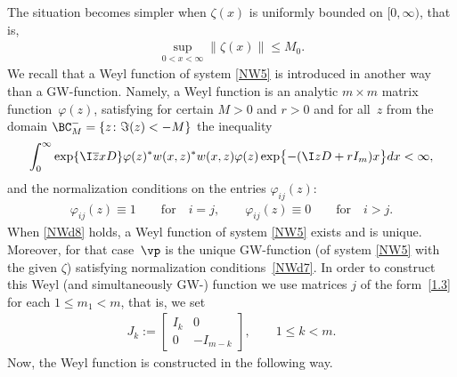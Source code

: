 The situation becomes simpler when
$\zeta(x)$ is uniformly bounded on $[0, \infty)$, that is,
\begin{gather}
  \sup\limits_{0 < x < \infty}
   \bigl\| \zeta (x) \bigr\|
 \leq M_0 .
 \label{NWd8}
\end{gather}
We recall that  a Weyl function of system \eqref{NW5} is introduced in another way
than a GW-function. Namely, a Weyl function
 is an analytic $m \times m$ matrix function~$\varphi (z)$,
satisfying for certain
$M > 0$
and
$r > 0$
and for all~$z$
from the domain
$\BC^{-}_M = \{ z \colon \Im(z) < - M \}$
the inequality
\begin{gather}
  \int_0^\infty
      \exp \{\I \overline z x D \}
     \varphi (z)^*
     w (x,z)^*
     w (x,z)
     \varphi (z)
     \exp
      \bigl\{{-}
        (\I z D + r I_m )x
      \bigr\}
  dx
 < \infty,
 \label{NWd6}
\end{gather}
and the normalization conditions on the entries $\varphi_{ij} (z)$:
\begin{gather}
   \varphi_{ij} (z) \equiv 1 \qquad \mbox{for} \quad i= j, \qquad
   \varphi_{ij} (z) \equiv 0 \qquad \mbox{for} \quad i > j.
 \label{NWd7}
\end{gather}
When \eqref{NWd8} holds,
a Weyl function of system \eqref{NW5} exists and is unique.
Moreover, for that case~$\vp$ is the unique GW-function (of system \eqref{NW5} with the given $\zeta$)
satisfying normalization conditions~\eqref{NWd7}. In order to construct this Weyl (and simultaneously GW-) function
we use matrices $j$ of the form~\eqref{1.3} for each $1\leq m_1 < m$, that is, we set
\begin{gather*}
J_k:= \left[
     \begin{matrix}
       I_k & 0   \\
       0 & -I_{m-k}
     \end{matrix}
    \right], \qquad   1\leq k < m.
\end{gather*}
Now, the Weyl function is constructed \cite[pp.~103--106]{SaSaR}
in the following way.


